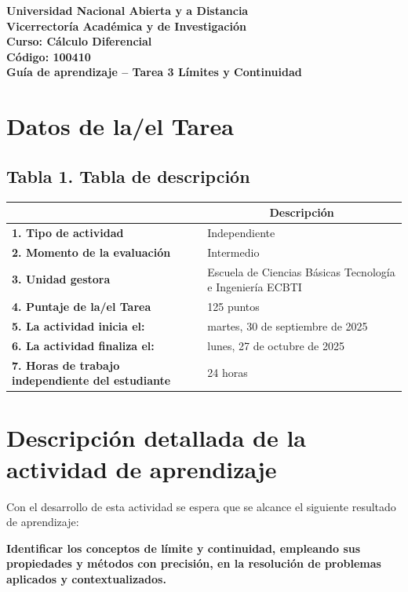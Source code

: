 \documentclass[12pt,letterpaper]{article}
\begin{document}
\begin{center}
\textbf{Universidad Nacional Abierta y a Distancia}\\
\textbf{Vicerrectoría Académica y de Investigación}\\
\textbf{Curso: Cálculo Diferencial}\\
\textbf{Código: 100410}\\
\vspace{0.5cm}
\Large\textbf{Guía de aprendizaje -- Tarea 3 Límites y Continuidad}
\end{center}

\section{Datos de la/el Tarea}

\subsection*{Tabla 1. Tabla de descripción}

\begin{tabularx}{\textwidth}{|>{\bfseries}p{5cm}|X|}
\hline
\multicolumn{1}{|c|}{\textbf{Aspecto}} & \multicolumn{1}{c|}{\textbf{Descripción}} \\
\hline
1. Tipo de actividad & Independiente \\
\hline
2. Momento de la evaluación & Intermedio \\
\hline
3. Unidad gestora & Escuela de Ciencias Básicas Tecnología e Ingeniería ECBTI \\
\hline
4. Puntaje de la/el Tarea & 125 puntos \\
\hline
5. La actividad inicia el: & martes, 30 de septiembre de 2025 \\
\hline
6. La actividad finaliza el: & lunes, 27 de octubre de 2025 \\
\hline
7. Horas de trabajo independiente del estudiante & 24 horas \\
\hline
\end{tabularx}

\section{Descripción detallada de la actividad de aprendizaje}

Con el desarrollo de esta actividad se espera que se alcance el siguiente resultado de aprendizaje:

\textbf{Identificar los conceptos de límite y continuidad, empleando sus propiedades y métodos con precisión, en la resolución de problemas aplicados y contextualizados.}
\end{document}
